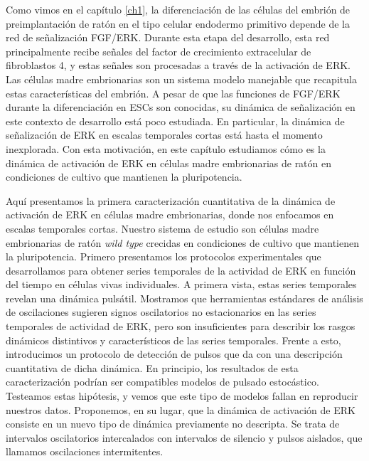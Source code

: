 \documentclass[./main.tex]{subfiles}
\begin{document}



Como vimos en el capítulo \ref{ch1}, la diferenciación de las células del embrión de preimplantación de ratón en el tipo celular endodermo primitivo depende de la red de señalización FGF/ERK. Durante esta etapa del desarrollo, esta red principalmente recibe señales del factor de crecimiento extracelular de fibroblastos 4, y estas señales son procesadas a través de la activación de ERK. Las células madre embrionarias son un sistema modelo manejable que recapitula estas características del embrión. A pesar de que las funciones de FGF/ERK durante la diferenciación en ESCs son conocidas, su dinámica de señalización en este contexto de desarrollo está poco estudiada. En particular, la dinámica de señalización de ERK en escalas temporales cortas está hasta el momento inexplorada. Con esta motivación, en este capítulo estudiamos cómo es la dinámica de activación de ERK en células madre embrionarias de ratón en condiciones de cultivo que mantienen la pluripotencia.

Aquí presentamos la primera caracterización cuantitativa de la dinámica de activación de ERK en células madre embrionarias, donde nos enfocamos en escalas temporales cortas. Nuestro sistema de estudio son células madre embrionarias de ratón \textit{wild type} crecidas en condiciones de cultivo que mantienen la pluripotencia. Primero presentamos los protocolos experimentales que desarrollamos para obtener series temporales de la actividad de ERK en función del tiempo en células vivas individuales. A primera vista, estas series temporales revelan una dinámica pulsátil. Mostramos que herramientas estándares de análisis de oscilaciones sugieren signos oscilatorios no estacionarios en las series temporales de actividad de ERK, pero son insuficientes para describir los rasgos dinámicos distintivos y característicos de las series temporales. Frente a esto, introducimos un protocolo de detección de pulsos que da con una descripción cuantitativa de dicha dinámica. En principio, los resultados de esta caracterización podrían ser compatibles modelos de pulsado estocástico. Testeamos estas hipótesis, y vemos que este tipo de modelos fallan en reproducir nuestros datos. Proponemos, en su lugar, que la dinámica de activación de ERK consiste en un nuevo tipo de dinámica previamente no descripta. Se trata de intervalos oscilatorios intercalados con intervalos de silencio y pulsos aislados, que llamamos oscilaciones intermitentes. 
\end{document}
